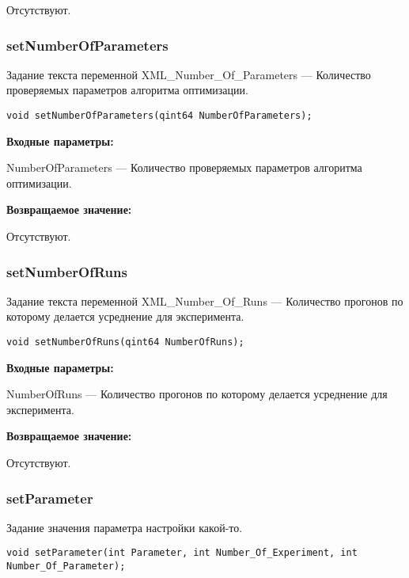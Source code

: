 \documentclass[a4paper,12pt]{article}
\begin{document}
Отсутствуют.


\subsubsection{setNumberOfParameters}\label{setNumberOfParameters}

Задание текста переменной  XML\_Number\_Of\_Parameters --- Количество проверяемых параметров алгоритма оптимизации.


\begin{lstlisting}[label=code_syntax_setNumberOfParameters,caption=Синтаксис]
void setNumberOfParameters(qint64 NumberOfParameters);
\end{lstlisting}

\textbf{Входные параметры:}

NumberOfParameters --- Количество проверяемых параметров алгоритма оптимизации.

\textbf{Возвращаемое значение:}

Отсутствуют.


\subsubsection{setNumberOfRuns}\label{setNumberOfRuns}

Задание текста переменной  XML\_Number\_Of\_Runs --- Количество прогонов по которому делается усреднение для эксперимента.


\begin{lstlisting}[label=code_syntax_setNumberOfRuns,caption=Синтаксис]
void setNumberOfRuns(qint64 NumberOfRuns);
\end{lstlisting}

\textbf{Входные параметры:}

NumberOfRuns --- Количество прогонов по которому делается усреднение для эксперимента.

\textbf{Возвращаемое значение:}

Отсутствуют.


\subsubsection{setParameter}\label{setParameter}

Задание значения параметра настройки какой-то.


\begin{lstlisting}[label=code_syntax_setParameter,caption=Синтаксис]
void setParameter(int Parameter, int Number_Of_Experiment, int Number_Of_Parameter);
\end{lstlisting}
\end{document}

